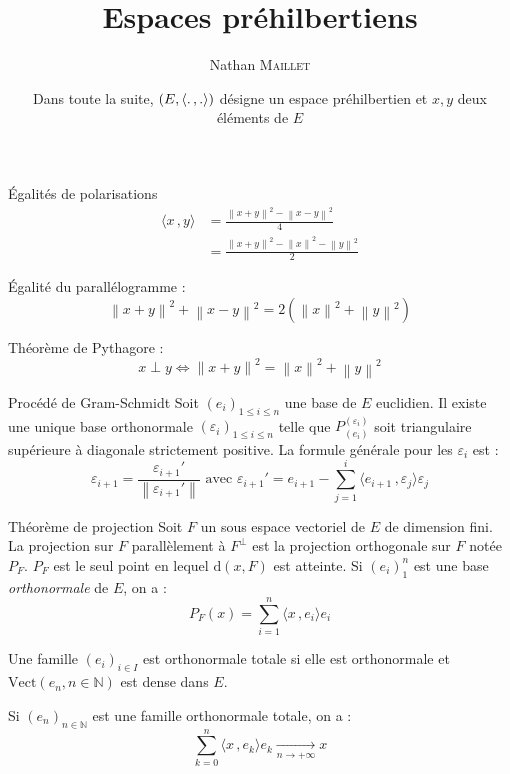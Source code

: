 \documentclass[french, a4paper, 11pt, twocolumn]{article}
\title{Espaces préhilbertiens}
\author{Nathan \textsc{Maillet}}
\date{Dans toute la suite, \(\left(E,\scal{.}{.}\right)\) désigne un espace préhilbertien et \(x,y\) deux éléments de \(E\)}
\newcommand{\norme}[1]{\left\| #1\right\|}
\newcommand{\scal}[2]{\langle #1\, ,#2 \rangle}
\newcommand{\limit}[1]{\underset{#1}{\rightarrow}}  %
\newcommand{\N}{\mathbb{N}}   %
\begin{document}
\maketitle

\begin{theorem}{Égalités de polarisations}
  \begin{align*}
    \scal{x}{y} &= \frac{\norme{x+y}^2-\norme{x-y}^2}{4} \\
                &= \frac{\norme{x+y}^2-\norme{x}^2-\norme{y}^2}{2}  
  \end{align*}

  \tcblower
  Égalité du parallélogramme :
    \[\norme{x+y}^2+\norme{x-y}^2=2\left(\norme{x}^2+\norme{y}^2\right)\]
   
  Théorème de Pythagore :
    \[x\perp y \iff \norme{x+y}^2=\norme{x}^2+\norme{y}^2\]
\end{theorem}

\begin{theorem}{Procédé de Gram-Schmidt}
  Soit \((e_i)_{1\leq i \leq n}\) une base de \(E\) euclidien.
  Il existe une unique base orthonormale \((\varepsilon_i)_{1\leq i \leq n}\) telle que \(P_{(e_i)}^{(\varepsilon_i)}\)
  soit triangulaire supérieure à diagonale strictement positive.
  La formule générale pour les \(\varepsilon_i\) est :
    \[\varepsilon_{i+1}=\frac{\varepsilon_{i+1}'}{\norme{\varepsilon_{i+1}'}} \text{ avec }  
  \varepsilon_{i+1}'=e_{i+1}-\sum_{j=1}^{i}\scal{e_{i+1}}{\varepsilon_j}\varepsilon_j\]
\end{theorem}

\begin{theorem}{Théorème de projection}
  Soit \(F\) un sous espace vectoriel de \(E\) de dimension fini.
  La projection sur \(F\) parallèlement à \(F^{\perp}\) est la projection orthogonale sur \(F\) notée \(P_F\).
  \(P_F\) est le seul point en lequel \(\mathrm{d}(x,F)\) est atteinte.
  Si \((e_i)_1^n\) est une base \emph{orthonormale} de \(E\), on a :
    \[P_F(x)=\sum_{i=1}^n \scal{x}{e_i}e_i\]
\end{theorem}

\begin{definition}
  Une famille \((e_i)_{i\in I}\) est orthonormale totale si elle est orthonormale et \(\mathrm{Vect}\left(e_n, n \in \N\right)\)
  est dense dans \(E\).

  \tcblower
  Si \((e_n)_{n\in \N}\) est une famille orthonormale totale, on a :
    \[\sum_{k=0}^n \scal{x}{e_k}e_k \limit{n\rightarrow +\infty} x\]
\end{definition}
\end{document}
